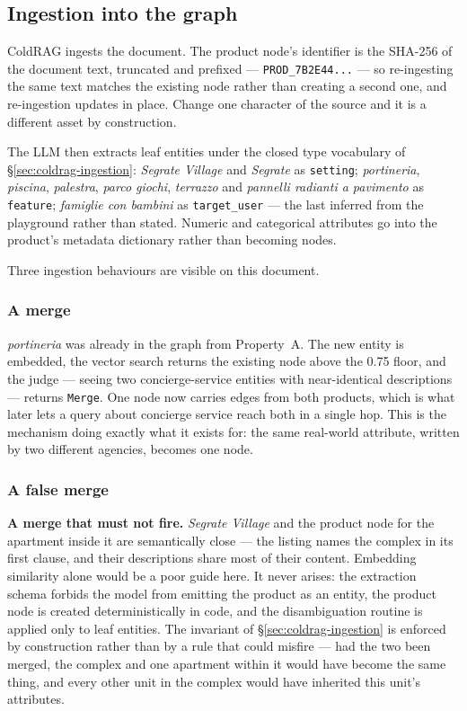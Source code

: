 \subsection{Ingestion into the graph}

ColdRAG ingests the document. The product node's identifier is the SHA-256 of the document text, truncated and prefixed --- \texttt{PROD\_7B2E44...} --- so re-ingesting the same text matches the existing node rather than creating a second one, and re-ingestion updates in place. Change one character of the source and it is a different asset by construction.

The LLM then extracts leaf entities under the closed type vocabulary of \S\ref{sec:coldrag-ingestion}: \emph{Segrate Village} and \emph{Segrate} as \texttt{setting}; \emph{portineria}, \emph{piscina}, \emph{palestra}, \emph{parco giochi}, \emph{terrazzo} and \emph{pannelli radianti a pavimento} as \texttt{feature}; \emph{famiglie con bambini} as \texttt{target\_user} --- the last inferred from the playground rather than stated. Numeric and categorical attributes go into the product's metadata dictionary rather than becoming nodes.

Three ingestion behaviours are visible on this document.

\subsubsection{A merge}
\emph{portineria} was already in the graph from Property~A. The new entity is embedded, the vector search returns the existing node above the 0.75 floor, and the judge --- seeing two concierge-service entities with near-identical descriptions --- returns \texttt{Merge}. One node now carries edges from both products, which is what later lets a query about concierge service reach both in a single hop. This is the mechanism doing exactly what it exists for: the same real-world attribute, written by two different agencies, becomes one node.

\subsubsection{A false merge}
\textbf{A merge that must not fire.} \emph{Segrate Village} and the product node for the apartment inside it are semantically close --- the listing names the complex in its first clause, and their descriptions share most of their content. Embedding similarity alone would be a poor guide here. It never arises: the extraction schema forbids the model from emitting the product as an entity, the product node is created deterministically in code, and the disambiguation routine is applied only to leaf entities. The invariant of \S\ref{sec:coldrag-ingestion} is enforced by construction rather than by a rule that could misfire --- had the two been merged, the complex and one apartment within it would have become the same thing, and every other unit in the complex would have inherited this unit's attributes.

